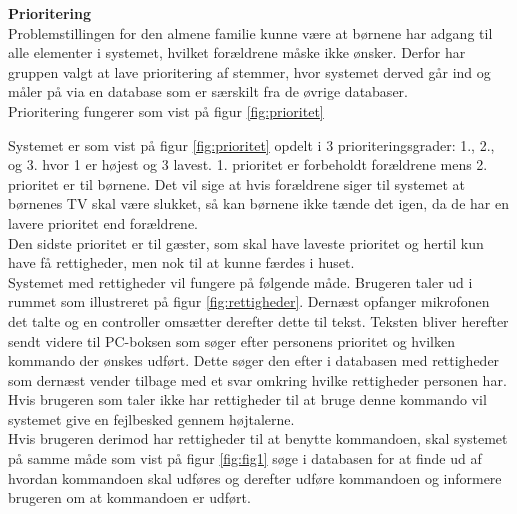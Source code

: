{\bf Prioritering}\\
Problemstillingen for den almene familie kunne være at børnene har adgang til alle elementer i systemet, hvilket forældrene måske ikke ønsker. Derfor har gruppen valgt at lave prioritering af stemmer, hvor systemet derved går ind og måler på via en database som er særskilt fra de øvrige databaser.\\
Prioritering fungerer som vist på figur \ref{fig:prioritet} 


Systemet er som vist på figur \ref{fig:prioritet} opdelt i 3 prioriteringsgrader: 1., 2., og 3. hvor 1 er højest og 3 lavest.
1. prioritet er forbeholdt forældrene mens 2. prioritet er til børnene. Det vil sige at hvis forældrene siger til systemet at børnenes TV skal være slukket, så kan børnene ikke tænde det igen, da de har en lavere prioritet end forældrene.\\

Den sidste prioritet er til gæster, som skal have laveste prioritet og hertil kun have få rettigheder, men nok til at kunne færdes i huset.\\


Systemet med rettigheder vil fungere på følgende måde. Brugeren taler ud i rummet som illustreret på figur \ref{fig:rettigheder}. Dernæst opfanger mikrofonen det talte og en controller omsætter derefter dette til tekst. Teksten bliver herefter sendt videre til PC-boksen som søger efter personens prioritet og hvilken kommando der ønskes udført. Dette søger den efter i databasen med rettigheder som dernæst vender tilbage med et svar omkring hvilke rettigheder personen har. Hvis brugeren som taler ikke har rettigheder til at bruge denne kommando vil systemet give en fejlbesked gennem højtalerne.\\

Hvis brugeren derimod har rettigheder til at benytte kommandoen, skal systemet på samme måde som vist på figur \ref{fig:fig1} søge i databasen for at finde ud af hvordan kommandoen skal udføres og derefter udføre kommandoen og informere brugeren om at kommandoen er udført.\\ 

